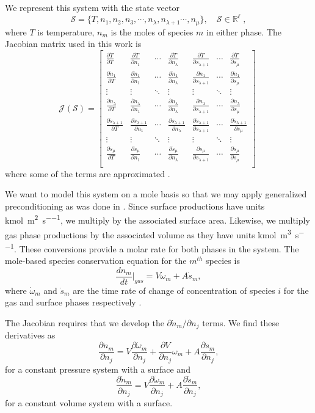 \documentclass[12pt]{ussci}
\def\gasspecies{\lambda}
\def\surfspecies{\mu}
\def \bmh{5pt} %
\newcommand{\pderv}[2]
{
    \frac{\partial #1}{\partial #2}
}
\newcommand{\jacsurfline}[1]
{
    \pderv{#1}{T} & \pderv{#1}{n_1} &
    \cdots & \pderv{#1}{n_\gasspecies}  & \pderv{#1}{s_{\gasspecies + 1}} &
    \cdots & \pderv{#1}{s_\surfspecies}\\[\bmh]
}
\newcommand{\dotsline}
{
    \vdots & \vdots &
    \ddots & \vdots & \vdots &
    \ddots & \vdots \\[\bmh]
}
\def\S{\mathcal{S}}
\newcommand{\J}[2][]{\mathcal{J}^{#1}(#2)}
\begin{document}
We represent this system with the state vector
\begin{equation}
    \S{} = \{T, n_1, n_2, n_3, \cdots, n_{\gasspecies}, n_{\gasspecies+1} \cdots, n_{\surfspecies}\},\quad\S{}\in\mathbb{R}^\ell \;,
\end{equation}
where $T$ is temperature, $n_{m}$ is the moles of species $m$ in either phase.
The Jacobian matrix used in this work is
\begin{equation}
    \J{\S{}} =
    \begin{bmatrix}
        \jacsurfline{\dot{T}}
        \jacsurfline{\dot{n}_{1}}
        \dotsline{}
        \jacsurfline{\dot{n}_{\gasspecies}}
        \jacsurfline{\dot{s}_{\gasspecies+1}}
        \dotsline{}
        \jacsurfline{\dot{s}_{\surfspecies}}
    \end{bmatrix} \;
\end{equation}
where some of the terms are approximated \cite{walker2022generalized}.

We want to model this system on a mole basis so that we may apply generalized preconditioning as was done in \cite{walker2022generalized}.
Since surface productions have units \si{\kilo\mole\per\meter\squared\per\second}, we multiply by the associated surface area.
Likewise, we multiply gas phase productions by the associated volume as they have units \si{\kilo\mole\per\meter\cubed\per\second}.
These conversions provide a molar rate for both phases in the system.
The mole-based species conservation equation for the $m^{th}$ species is
\begin{equation}
    \label{eq:species-cons}
    \frac{dn_{m}}{dt}\Big\vert_{gas} = V \dot{\omega}_{m} + A \dot{s}_{m},
\end{equation}
where $\dot{\omega}_{m}$ and $\dot{s}_{m}$ are the time rate of change of concentration of species $i$ for the gas and surface phases respectively \cite{walker2022generalized}.

The Jacobian requires that we develop the $\partial \dot{n}_{m}/\partial n_j$ terms.
We find these derivatives as
\begin{equation}
        \frac{\partial \dot{n}_{m}}{\partial n_j} = V\frac{\partial \dot{\omega}_{m}}{\partial n_j} + \frac{\partial V}{\partial n_j}\omega_{m}+ A\frac{\partial \dot{s}_{m}}{\partial n_j},
\end{equation}
for a constant pressure system with a surface and
\begin{equation}
    \frac{\partial \dot{n}_{m}}{\partial n_j} = V\frac{\partial \dot{\omega}_{m}}{\partial n_j} + A\frac{\partial \dot{s}_{m}}{\partial n_j},
\end{equation}
for a constant volume system with a surface.
\end{document}

